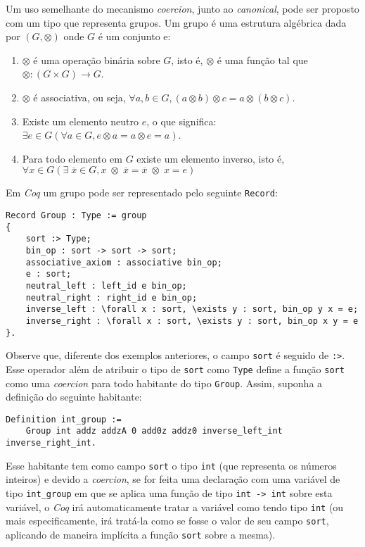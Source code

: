 Um uso semelhante do mecanismo \textit{coercion}, junto ao \textit{canonical}, pode ser proposto com um tipo que representa grupos. Um grupo é uma estrutura algébrica dada por $(G, \otimes)$ onde $G$ é um conjunto e:
\begin{enumerate}
    \item $\otimes$ é uma operação binária sobre $G$, isto é, $\otimes$ é uma função tal que $\otimes : (G \times G) \rightarrow G$.
    \item $\otimes$ é associativa, ou seja, $\forall a, b \in G, (a \otimes b) \otimes c = a \otimes (b \otimes c)$.
    \item Existe um elemento neutro $e$, o que significa: $\exists e \in G (\forall a \in G, e \otimes a = a \otimes e = a)$. 
    \item Para todo elemento em $G$ existe um elemento inverso, isto é, \\
    $\forall x \in G (\exists \;\overline{x} \in G, x \;\otimes\; \overline{x} = \overline{x} \;\otimes\; x = e)$
\end{enumerate}
Em \textit{Coq} um grupo pode ser representado pelo seguinte \lstinline[language = coq]$Record$:
    \begin{lstlisting}[language = coq,frame=single,tabsize=1]
Record Group : Type := group 
{
    sort :> Type;
    bin_op : sort -> sort -> sort;
    associative_axiom : associative bin_op;
    e : sort;
    neutral_left : left_id e bin_op;
    neutral_right : right_id e bin_op;
    inverse_left : \forall x : sort, \exists y : sort, bin_op y x = e; 
    inverse_right : \forall x : sort, \exists y : sort, bin_op x y = e 
}.
    \end{lstlisting}
Observe que, diferente dos exemplos anteriores, o campo \lstinline[language = coq]$sort$ é seguido de \lstinline[language = coq]$:>$. Esse operador além de atribuir o tipo de \lstinline[language = coq]$sort$ como \lstinline[language = coq]$Type$
define a função \lstinline[language = coq]$sort$ como uma \textit{coercion} para todo habitante do tipo \lstinline[language = coq]$Group$. Assim, suponha a definição do seguinte habitante:
    \begin{lstlisting}[language = coq,frame=single,tabsize=1]
Definition int_group := 
    Group int addz addzA 0 add0z addz0 inverse_left_int inverse_right_int.
    \end{lstlisting}
Esse habitante tem como campo \lstinline[language = coq]$sort$ o tipo \lstinline[language = coq]$int$ (que representa os números inteiros) e devido a \textit{coercion}, se for feita uma declaração com uma variável de tipo \lstinline[language = coq]$int_group$ em que se aplica uma função de tipo \lstinline[language = coq]$int -> int$ sobre esta variável, o \textit{Coq} irá automaticamente tratar a variável como tendo tipo \lstinline[language = coq]$int$ (ou mais especificamente, irá tratá-la como se fosse o valor de seu campo \lstinline[language = coq]$sort$, aplicando de maneira implícita a função \lstinline[language = coq]$sort$ sobre a mesma).

